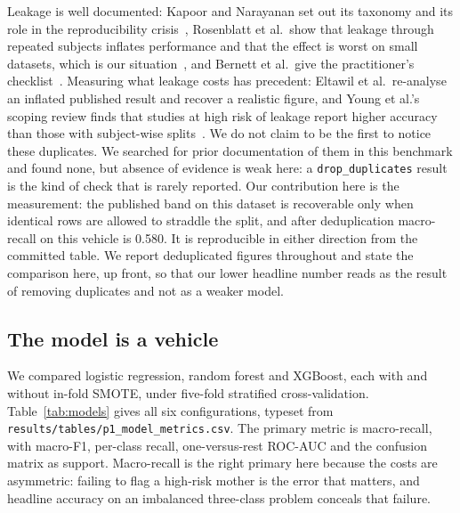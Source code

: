 Leakage is well
documented: Kapoor and Narayanan set out its taxonomy and its role in the
reproducibility crisis~\citep{kapoor2023leakage}, Rosenblatt et al.\ show
that leakage through repeated subjects inflates performance and that the
effect is worst on small datasets, which is our
situation~\citep{rosenblatt2024leakage}, and Bernett et al.\ give the
practitioner's checklist~\citep{bernett2024guiding}. Measuring what leakage
costs has precedent: Eltawil et al.\ re-analyse an inflated published result and
recover a realistic figure, and Young et al.'s scoping review finds that
studies at high risk of leakage report higher accuracy than those with
subject-wise splits~\citep{eltawil2026comment,young2025leakage}. We do not claim
to be the first to notice these duplicates. We searched for prior
documentation of them in this benchmark and found none, but absence of
evidence is weak here: a \texttt{drop\_duplicates} result is the kind of
check that is rarely reported. Our contribution here is the measurement: the published band on this dataset is recoverable only when
identical rows are allowed to straddle the split, and after deduplication
macro-recall on this vehicle is 0.580. It is reproducible in either direction
from the committed table. We report deduplicated figures
throughout and state the comparison here, up front, so that our lower
headline number reads as the result of removing duplicates and not as a
weaker model.

\subsection{The model is a vehicle}
\label{sec:data-model}

We compared logistic regression, random forest and XGBoost, each with and
without in-fold SMOTE, under five-fold stratified cross-validation.
Table~\ref{tab:models} gives all six configurations, typeset from
\texttt{results/tables/p1\_model\_metrics.csv}. The primary metric is
macro-recall, with macro-F1, per-class recall, one-versus-rest
ROC-AUC and the confusion matrix as support. Macro-recall is the right
primary here because the costs are asymmetric: failing to flag a high-risk
mother is the error that matters, and headline accuracy on an imbalanced
three-class problem conceals that failure.

